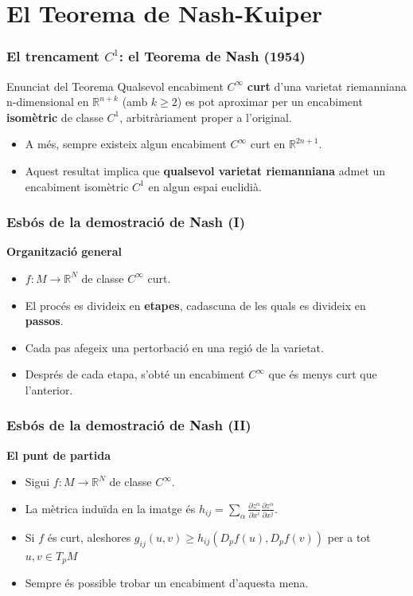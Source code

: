 \documentclass[10pt]{beamer}
\begin{document}
\section{El Teorema de Nash-Kuiper}

\begin{frame}
    \frametitle{El trencament $C^1$: el Teorema de Nash (1954)}

    \begin{block}{Enunciat del Teorema}
        Qualsevol encabiment $C^\infty$ \textbf{curt} d'una varietat riemanniana n-dimensional en $\mathbb{R}^{n+k}$ (amb $k \geq 2$) es pot aproximar per un encabiment \textbf{isomètric} de classe \textbf{$C^1$}, arbitràriament proper a l'original.
    \end{block}
    
    \begin{itemize}
        \item A més, sempre existeix algun encabiment $C^\infty$ curt en $\mathbb R^{2n+1}$.
        \pause
        \item Aquest resultat implica que \textbf{qualsevol varietat riemanniana} admet un encabiment isomètric $C^1$ en algun espai euclidià.
    \end{itemize}
    
\end{frame}

\begin{frame}
    \frametitle{Esbós de la demostració de Nash (I)}
    
    \textbf{Organització general}
    \begin{itemize}
        \item $f:M \to \mathbb{R}^N$ de classe $C^\infty$ curt.
        \item El procés es divideix en \textbf{etapes}, cadascuna de les quals es divideix en \textbf{passos}.
        \item Cada pas afegeix una pertorbació en una regió de la varietat.
        \item Després de cada etapa, s'obté un encabiment $C^\infty$ que és menys curt que l'anterior.
    \end{itemize}
\end{frame}

\begin{frame}
    \frametitle{Esbós de la demostració de Nash (II)}
    
    \textbf{El punt de partida}
    \begin{itemize}
        \item Sigui $f:M \to \mathbb{R}^N$ de classe $C^\infty$.
        \item La mètrica induïda en la imatge és $h_{ij} = \sum_{\alpha} \frac{\partial z^\alpha}{\partial x^i}\frac{\partial z^\alpha}{\partial x^j}$.
        \item Si $f$ és curt, aleshores $g_{ij}(u,v) \ge h_{ij}(D_pf(u),D_pf(v))$ per a tot $u,v \in T_pM$
        \item {Sempre és possible trobar un encabiment d'aquesta mena.}
    \end{itemize}
\end{frame}
\end{document}
